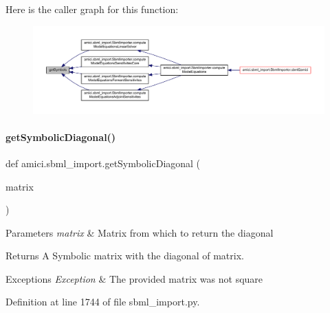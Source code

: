 Here is the caller graph for this function\+:
\nopagebreak
\begin{figure}[H]
\begin{center}
\leavevmode
\includegraphics[width=350pt]{namespaceamici_1_1sbml__import_a986c53b165e78ab8ba560976b4506294_icgraph}
\end{center}
\end{figure}
\mbox{\label{namespaceamici_1_1sbml__import_a1d4d368d095429428738451ae90d911f}} 
\paragraph{\texorpdfstring{get\+Symbolic\+Diagonal()}{getSymbolicDiagonal()}}
{\footnotesize\ttfamily def amici.\+sbml\+\_\+import.\+get\+Symbolic\+Diagonal (\begin{DoxyParamCaption}\item[{}]{matrix }\end{DoxyParamCaption})}


\begin{DoxyParams}{Parameters}
{\em matrix} & Matrix from which to return the diagonal\\
\hline
\end{DoxyParams}
\begin{DoxyReturn}{Returns}
A Symbolic matrix with the diagonal of {\ttfamily matrix}.
\end{DoxyReturn}

\begin{DoxyExceptions}{Exceptions}
{\em Exception} & The provided matrix was not square \\
\hline
\end{DoxyExceptions}


Definition at line 1744 of file sbml\+\_\+import.\+py.


